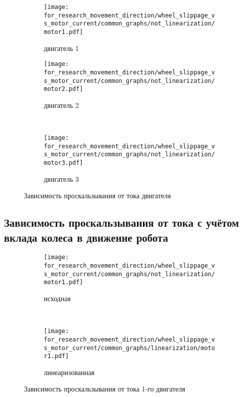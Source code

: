 \begin{figure}[H]
    \centering
    \begin{subfigure}{0.49\textwidth}
        \centering
        \texttt{[image: for\_research\_movement\_direction/wheel\_slippage\_vs\_motor\_current/common\_graphs/not\_linearization/motor1.pdf]}
        \caption{двигатель 1}
    \end{subfigure}
    \hspace{0.005\textwidth}
    \begin{subfigure}{0.49\textwidth}
        \centering
        \texttt{[image: for\_research\_movement\_direction/wheel\_slippage\_vs\_motor\_current/common\_graphs/not\_linearization/motor2.pdf]}
        \caption{двигатель 2}
    \end{subfigure} \\
    \vspace{4pt}
    \centering
    \begin{subfigure}{0.49\textwidth}
        \centering
        \texttt{[image: for\_research\_movement\_direction/wheel\_slippage\_vs\_motor\_current/common\_graphs/not\_linearization/motor3.pdf]}
        \caption{двигатель 3}
    \end{subfigure}
    \caption{Зависимость проскальзывания от тока двигателя}
\end{figure}

\subsection{Зависимость проскальзывания от тока с учётом вклада колеса в движение робота}

\begin{figure}[H]
    \centering
    \begin{subfigure}{0.50\textwidth}
        \texttt{[image: for\_research\_movement\_direction/wheel\_slippage\_vs\_motor\_current/common\_graphs/not\_linearization/motor1.pdf]}
        \caption{исходная}
    \end{subfigure} \\
    \begin{subfigure}{0.50\textwidth}
        \texttt{[image: for\_research\_movement\_direction/wheel\_slippage\_vs\_motor\_current/common\_graphs/linearization/motor1.pdf]}
        \caption{линеаризованная}
    \end{subfigure}
    \caption{Зависимость проскальзывания от тока 1-го двигателя}
\end{figure}

